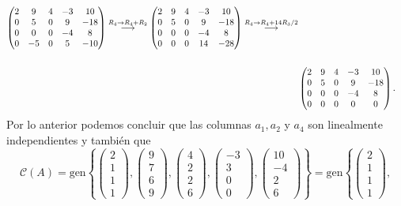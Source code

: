 \documentclass[11pt,letterpaper]{article}
\newcommand{\mcC}{\mathcal{C}}
\newcommand{\grstep}[2][\relax]{%
   \ensuremath{\mathrel{
       {\mathop{\longrightarrow}\limits^{#2\mathstrut}_{
                                     \begin{subarray}{l} #1 \end{subarray}}}}}}
\newcommand{\gen}{\text{gen}}
\begin{document}
\begin{enumerate}
\begin{align}
%
\begin{pmatrix}
2 & 9 & 4 & -3 & 10\\
0 & 5 & 0 &  9 & -18\\
0 & 0 & 0 & -4 &  8\\
0 &-5 & 0 &  5 & -10
\end{pmatrix}%
\grstep[]{R_4 \rightarrow R_4+R_2}
%
\begin{pmatrix}
2 & 9 & 4 & -3 & 10\\
0 & 5 & 0 &  9 & -18\\
0 & 0 & 0 & -4 &  8\\
0 & 0 & 0 & 14 & -28
\end{pmatrix}%
\grstep[]{R_4 \rightarrow R_4+14R_3/2}\nonumber \\ \nonumber\\
&\begin{pmatrix}
2 & 9 & 4 & -3 & 10\\
0 & 5 & 0 &  9 & -18\\
0 & 0 & 0 & -4 &  8\\
0 & 0 & 0 &  0 & 0
\end{pmatrix}. 
\end{align}
Por lo anterior podemos concluir que las columnas $a_1,a_2$ y $a_4$ son linealmente independientes y también que 
$$\mcC(A)=\gen\left\{\begin{pmatrix}2\\1\\1\\1\end{pmatrix},
\begin{pmatrix} 9\\7\\6\\9\end{pmatrix},
\begin{pmatrix}4\\2\\2\\6\end{pmatrix},
\begin{pmatrix}-3\\3\\0\\0 \end{pmatrix},
\begin{pmatrix}10\\-4\\2\\6 \end{pmatrix} \right\}=\gen\left\{\begin{pmatrix}2\\1\\1\\1\end{pmatrix},
$$
\end{enumerate}
\end{document}
